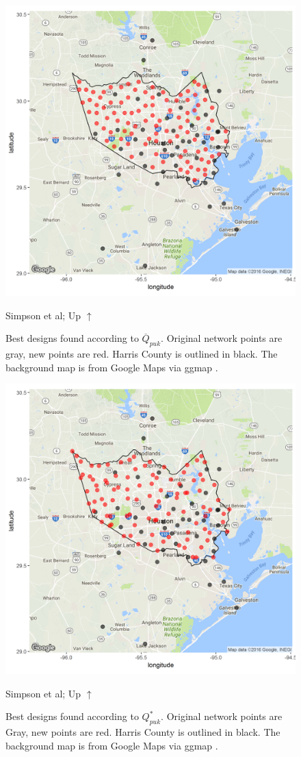 \documentclass[cmbright]{staauth}
\begin{document}
\begin{figure}[p]
\begin{preview}
\centering
\includegraphics[width=.8\textwidth]{sig2pukmean.png}
\ifPreview
\caption{Simpson et al; Up $\uparrow$}
\else
\caption{Best designs found according to $\overline{Q}_{puk}$. Original network points are gray, new points are red. Harris County is outlined in black. The background map is from Google Maps via ggmap \citep{ggmap2013}.}
\label{fig:designoutmean}
\fi
\end{preview}
\end{figure}

\begin{figure}[p]
\begin{preview}
\centering
\includegraphics[width=.8\textwidth]{sig2pukmax.png}
\ifPreview
\caption{Simpson et al; Up $\uparrow$}
\else
\caption{Best designs found according to $Q^*_{puk}$. Original network points are Gray, new points are red. Harris County is outlined in black. The background map is from Google Maps via ggmap \citep{ggmap2013}.}
\label{fig:designoutmax}
\fi
\end{preview}
\end{figure}
\end{document}
